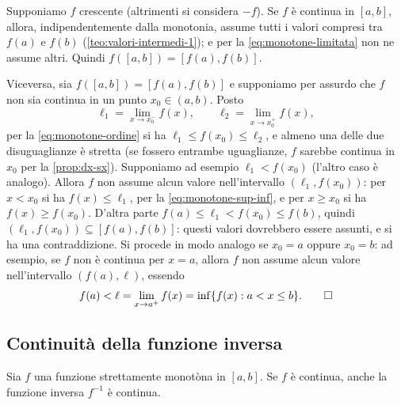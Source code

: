 \begin{dimostrazione}
Supponiamo $f$ crescente (altrimenti si considera $-f$). Se $f$ è continua in $[a,b]$,
allora, indipendentemente dalla monotonia, assume tutti i valori compresi tra $f(a)$ e
$f(b)$ (\cref{teo:valori-intermedi-1}); e per la \eqref{eq:monotone-limitata} non ne
assume altri. Quindi $f([a,b])=[f(a),f(b)]$.

Viceversa, sia $f([a,b])=[f(a),f(b)]$ e supponiamo per assurdo che $f$ non sia continua
in un punto $x_{0}\in(a,b)$. Posto
\begin{equation}\label{eq:criterio-salto}
  \ell_{1}=\lim_{x\to x_{0}^{-}}f(x), \qquad \ell_{2}=\lim_{x\to x_{0}^{+}}f(x),
\end{equation}
per la \eqref{eq:monotone-ordine} si ha $\ell_{1}\le f(x_{0})\le\ell_{2}$, e almeno una
delle due disuguaglianze è stretta (se fossero entrambe uguaglianze, $f$ sarebbe
continua in $x_{0}$ per la \cref{prop:dx-sx}). Supponiamo ad esempio $\ell_{1}<f(x_{0})$
(l'altro caso è analogo). Allora $f$ non assume alcun valore nell'intervallo
$(\ell_{1},f(x_{0}))$: per $x<x_{0}$ si ha $f(x)\le\ell_{1}$, per la
\eqref{eq:monotone-sup-inf}, e per $x\ge x_{0}$ si ha $f(x)\ge f(x_{0})$. D'altra parte
$f(a)\le\ell_{1}<f(x_{0})\le f(b)$, quindi $(\ell_{1},f(x_{0}))\subseteq[f(a),f(b)]$:
questi valori dovrebbero essere assunti, e si ha una contraddizione. Si procede in modo
analogo se $x_{0}=a$ oppure $x_{0}=b$: ad esempio, se $f$ non è continua per $x=a$,
allora $f$ non assume alcun valore nell'intervallo $(f(a),\ell)$, essendo
\begin{equation}\label{eq:criterio-estremo}
  f(a)<\ell=\lim_{x\to a^{+}}f(x)=\inf\{f(x) : a<x\le b\}. \qedhere
\end{equation}
\end{dimostrazione}

\subsection{Continuità della funzione inversa}

\begin{teorema}\label{teo:continuita-inversa}
Sia $f$ una funzione strettamente monotòna in $[a,b]$. Se $f$ è continua, anche la
funzione inversa $f^{-1}$ è continua.
\end{teorema}

\begin{schema}
\end{schema}

